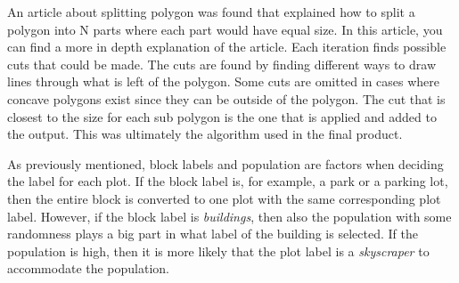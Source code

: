 An article about splitting polygon was found that explained how to split a polygon into N parts where each part would have equal size\cite{polygon_splitting_article}. 
In this article, you can find a more in depth explanation of the article. 
Each iteration finds possible cuts that could be made. 
The cuts are found by finding different ways to draw lines through what is left of the polygon. 
Some cuts are omitted in cases where concave polygons exist since they can be outside of the polygon. 
The cut that is closest to the size for each sub polygon is the one that is applied and added to the output. 
This was ultimately the algorithm used in the final product. 

As previously mentioned, block labels and population are factors when deciding the label for each plot. 
If the block label is, for example, a park or a parking lot, then the entire block is converted to one plot with the same corresponding plot label. 
However, if the block label is \textit{buildings}, then also the population with some randomness plays a big part in what label of the building is selected. 
If the population is high, then it is more likely that the plot label is a \textit{skyscraper} to accommodate the population. 
